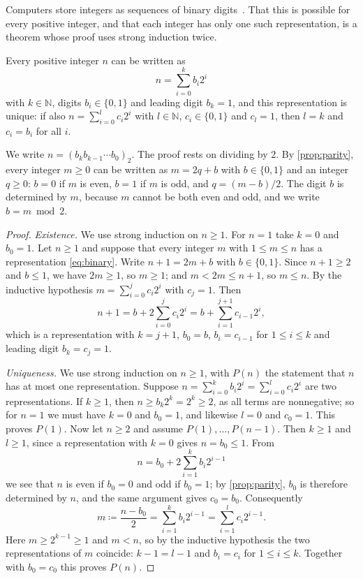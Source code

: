 Computers store integers as sequences of binary digits~\cite{knuth1997taocp2}. That this is possible for every positive integer, and that each integer has only one such representation, is a theorem whose proof uses strong induction twice.

\begin{theorem}
\label{thm:binary}
Every positive integer $n$ can be written as
\begin{equation}
n=\sum_{i=0}^{k}b_i2^i
\label{eq:binary}
\end{equation}
with $k\in\mathbb N$, digits $b_i\in\{0,1\}$ and leading digit $b_k=1$, and this representation is unique: if also $n=\sum_{i=0}^{l}c_i2^i$ with $l\in\mathbb N$, $c_i\in\{0,1\}$ and $c_l=1$, then $l=k$ and $c_i=b_i$ for all $i$.
\end{theorem}

We write $n=(b_kb_{k-1}\cdots b_0)_2$. The proof rests on dividing by $2$. By \cref{prop:parity}, every integer $m\ge0$ can be written as $m=2q+b$ with $b\in\{0,1\}$ and an integer $q\ge0$: $b=0$ if $m$ is even, $b=1$ if $m$ is odd, and $q=(m-b)/2$. The digit $b$ is determined by $m$, because $m$ cannot be both even and odd, and we write $b=m\bmod2$.

\begin{proof}
\emph{Existence.} We use strong induction on $n\ge1$. For $n=1$ take $k=0$ and $b_0=1$. Let $n\ge1$ and suppose that every integer $m$ with $1\le m\le n$ has a representation \eqref{eq:binary}. Write $n+1=2m+b$ with $b\in\{0,1\}$. Since $n+1\ge2$ and $b\le1$, we have $2m\ge1$, so $m\ge1$; and $m<2m\le n+1$, so $m\le n$. By the inductive hypothesis $m=\sum_{i=0}^{j}c_i2^i$ with $c_j=1$. Then
\[
n+1=b+2\sum_{i=0}^{j}c_i2^i=b+\sum_{i=1}^{j+1}c_{i-1}2^i,
\]
which is a representation with $k=j+1$, $b_0=b$, $b_i=c_{i-1}$ for $1\le i\le k$ and leading digit $b_k=c_j=1$.

\emph{Uniqueness.} We use strong induction on $n\ge1$, with $P(n)$ the statement that $n$ has at most one representation. Suppose $n=\sum_{i=0}^{k}b_i2^i=\sum_{i=0}^{l}c_i2^i$ are two representations. If $k\ge1$, then $n\ge b_k2^k=2^k\ge2$, as all terms are nonnegative; so for $n=1$ we must have $k=0$ and $b_0=1$, and likewise $l=0$ and $c_0=1$. This proves $P(1)$. Now let $n\ge2$ and assume $P(1),\ldots,P(n-1)$. Then $k\ge1$ and $l\ge1$, since a representation with $k=0$ gives $n=b_0\le1$. From
\[
n=b_0+2\sum_{i=1}^{k}b_i2^{i-1}
\]
we see that $n$ is even if $b_0=0$ and odd if $b_0=1$; by \cref{prop:parity}, $b_0$ is therefore determined by $n$, and the same argument gives $c_0=b_0$. Consequently
\[
m\coloneqq\frac{n-b_0}{2}=\sum_{i=1}^{k}b_i2^{i-1}=\sum_{i=1}^{l}c_i2^{i-1}.
\]
Here $m\ge2^{k-1}\ge1$ and $m<n$, so by the inductive hypothesis the two representations of $m$ coincide: $k-1=l-1$ and $b_i=c_i$ for $1\le i\le k$. Together with $b_0=c_0$ this proves $P(n)$.
\end{proof}

